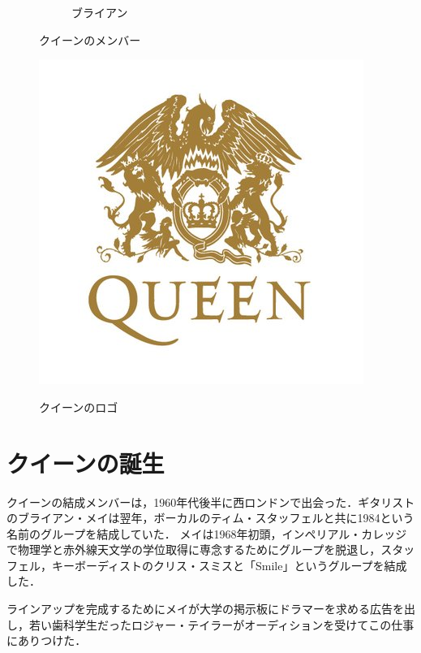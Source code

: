 \documentclass[a4j, twocolumn]{jarticle}
\begin{document}
\begin{figure}[htb]
\begin{subfigure}[b]{0.15\textwidth}
    \vspace{-1.0mm}
    \caption{ブライアン}
    \label{johnimg}
  \end{subfigure}
      \vspace{-3.0mm}
      \caption{クイーンのメンバー}
     \label{jpnimg}
\end{figure}

\begin{figure}[htb]
  \begin{center}
      \includegraphics[scale=0.3]{Queen.jpg}
      \caption{クイーンのロゴ}
      \vspace{-15pt}
      \label{Queen_Image}
  \end{center}
\end{figure}

\vspace{-15pt}

\section{クイーンの誕生}

クイーンの結成メンバーは，1960年代後半に西ロンドンで出会った．ギタリストのブライアン・メイは翌年，ボーカルのティム・スタッフェルと共に1984という名前のグループを結成していた．\cite{Blake}
メイは1968年初頭，インペリアル・カレッジで物理学と赤外線天文学の学位取得に専念するためにグループを脱退し，スタッフェル，キーボーディストのクリス・スミスと「Smile」というグループを結成した．\cite{Blake}

ラインアップを完成するためにメイが大学の掲示板にドラマーを求める広告を出し，若い歯科学生だったロジャー・テイラーがオーディションを受けてこの仕事にありつけた．\cite{Hodkinson}
\end{document}
